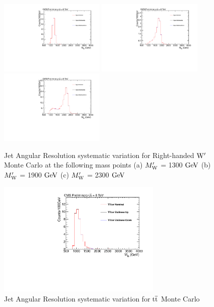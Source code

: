 \begin{figure}[htcb]
\begin{center}
\includegraphics[width=0.45\textwidth]{AN-13-004/figs/Signal_M1300_EtaScaling}
\includegraphics[width=0.45\textwidth]{AN-13-004/figs/Signal_M1900_EtaScaling}
\includegraphics[width=0.45\textwidth]{AN-13-004/figs/Signal_M2300_EtaScaling}
\caption{
Jet Angular Resolution systematic variation for Right-handed $\mathrm{W}^\prime$ Monte Carlo at the following mass points
(a) $M_\mathrm{W}^\prime$ = 1300$~\mathrm{GeV}$ 
(b) $M_\mathrm{W}^\prime$ = 1900$~\mathrm{GeV}$
(c) $M_\mathrm{W}^\prime$ = 2300$~\mathrm{GeV}$ 
}
\label{figs:signalJAR}
\end{center}
\end{figure}

\begin{figure}[htcb]
\begin{center}
\includegraphics[width=0.7\textwidth]{AN-13-004/figs/TTbar_EtaScaling}
\caption{Jet Angular Resolution systematic variation for $\mathrm{t\overline{t}}$ Monte Carlo}
\label{figs:ttbarJAR}
\end{center}
\end{figure}

